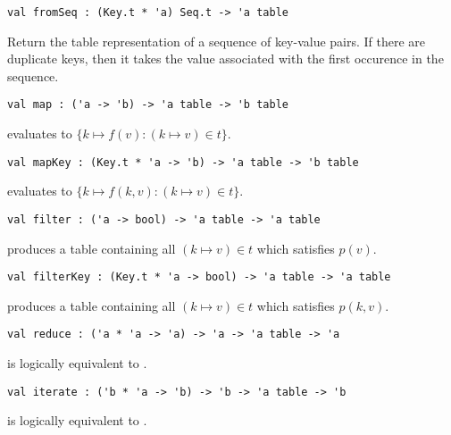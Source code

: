 \begin{gram}[fromSeq]
\begin{verbatim}
val fromSeq : (Key.t * 'a) Seq.t -> 'a table
\end{verbatim}
Return the table representation of a sequence of key-value pairs. If there are
duplicate keys, then it takes the value associated with the first occurence in
the sequence.
\end{gram}

\begin{gram}[map]
\begin{verbatim}
val map : ('a -> 'b) -> 'a table -> 'b table
\end{verbatim}
 evaluates to $\{k \mapsto f(v) : (k \mapsto v) \in t\}$.
\end{gram}

\begin{gram}[mapKey]
\begin{verbatim}
val mapKey : (Key.t * 'a -> 'b) -> 'a table -> 'b table
\end{verbatim}
 evaluates to $\{k \mapsto f(k, v) : (k \mapsto v) \in t\}$.
\end{gram}

\begin{gram}[filter]
\begin{verbatim}
val filter : ('a -> bool) -> 'a table -> 'a table
\end{verbatim}
 produces a table containing all $(k \mapsto v) \in t$ which
satisfies $p(v)$.
\end{gram}

\begin{gram}[filterKey]
\begin{verbatim}
val filterKey : (Key.t * 'a -> bool) -> 'a table -> 'a table
\end{verbatim}
 produces a table containing all $(k \mapsto v) \in t$ which
satisfies $p(k,v)$.
\end{gram}

\begin{gram}[reduce]
\begin{verbatim}
val reduce : ('a * 'a -> 'a) -> 'a -> 'a table -> 'a
\end{verbatim}
 is logically equivalent to .
\end{gram}

\begin{gram}[iterate]
\begin{verbatim}
val iterate : ('b * 'a -> 'b) -> 'b -> 'a table -> 'b
\end{verbatim}
 is logically equivalent to .
\end{gram}

